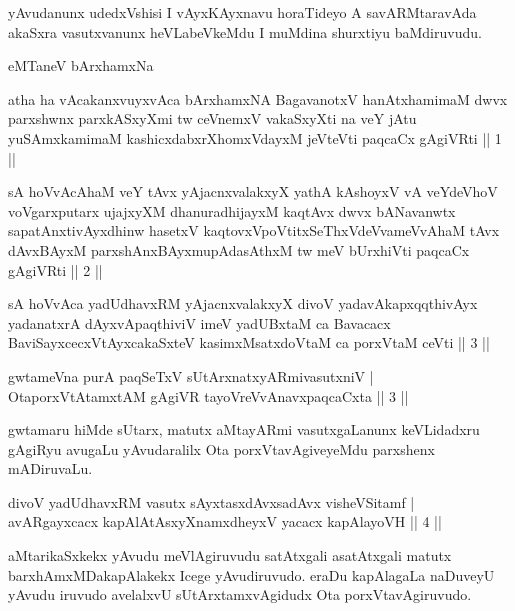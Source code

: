 \begin{artha}
yAvudanunx udedxVshisi I vAyxKAyxnavu horaTideyo A savARMtaravAda akaSxra vasutxvanunx heVLabeVkeMdu I muMdina shurxtiyu baMdiruvudu.
\end{artha}

\begin{center}
eMTaneV bArxhamxNa
\end{center}

\begin{shl}
atha ha vAcakanxvuyxvAca bArxhamxNA BagavanotxV hanAtxhamimaM dwvx parxshwnx parxkASxyXmi tw ceVnemxV vakaSxyXti na veY jAtu yuSAmxkamimaM kashicxdabxrXhomxVdayxM jeVteVti paqcaCx gAgiVRti || 1 ||
\end{shl}

\begin{shl}
sA hoVvAcAhaM veY tAvx yAjacnxvalakxyX yathA kAshoyxV vA veYdeVhoV voVgarxputarx ujajxyXM dhanuradhijayxM kaqtAvx dwvx bANavanwtx sapatAnxtivAyxdhinw hasetxV kaqtovxVpoVtitxSeThxVdeVvameVvAhaM tAvx dAvxBAyxM parxshAnxBAyxmupAdasAthxM tw meV bUrxhiVti paqcaCx gAgiVRti || 2 ||
\end{shl}

\begin{shl}
sA hoVvAca yadUdhavxRM yAjacnxvalakxyX divoV yadavAkapxqqthivAyx yadanatxrA dAyxvApaqthiviV imeV yadUBxtaM ca Bavacacx BaviSayxcecxVtAyxcakaSxteV kasimxMsatxdoVtaM ca porxVtaM ceVti || 3 ||
\end{shl}

\begin{shl}
gwtameVna purA paqSeTxV sUtArxnatxyARmivasutxniV |\\
OtaporxVtAtamxtAM gAgiVR tayoVreVvAnavxpaqcaCxta \hfill || 3 ||
\end{shl}

\begin{artha}%
gwtamaru hiMde sUtarx, matutx aMtayARmi vasutxgaLanunx keVLidadxru gAgiRyu avugaLu yAvudaralilx Ota porxVtavAgiveyeMdu parxshenx mADiruvaLu.
\end{artha}


\begin{shl}
divoV yadUdhavxRM vasutx sAyxtasxdAvx\s sadAvx visheVSitamf |\\
avARgayxcacx kapAlAtAsxyXnamxdheyxV yacacx kapAlayoVH \hfill || 4 ||
\end{shl}

\begin{artha}
aMtarikaSxkekx yAvudu meVlAgiruvudu satAtxgali asatAtxgali matutx barxhAmxMDa\-kapAlakekx Icege yAvudiruvudo. eraDu kapAlagaLa naDuveyU yAvudu iruvudo avelalxvU sUtArxtamxvAgidudx Ota porxVtavAgiruvudo.
\end{artha}

